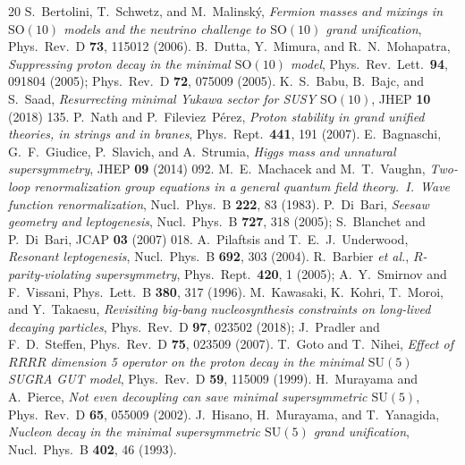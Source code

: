 \documentclass[11pt,a4paper]{article}
\begin{document}
\begin{thebibliography}{20}
 S.~Bertolini, T.~Schwetz, and M.~Malinsk\'y, \textit{Fermion masses and mixings in $\mathrm{SO}(10)$ models and the neutrino challenge to $\mathrm{SO}(10)$ grand unification}, Phys.\ Rev.\ D \textbf{73}, 115012 (2006).
 B.~Dutta, Y.~Mimura, and R.~N.~Mohapatra, \textit{Suppressing proton decay in the minimal $\mathrm{SO}(10)$ model}, Phys.\ Rev.\ Lett.\ \textbf{94}, 091804 (2005); Phys.\ Rev.\ D \textbf{72}, 075009 (2005).
 K.~S.~Babu, B.~Bajc, and S.~Saad, \textit{Resurrecting minimal Yukawa sector for SUSY $\mathrm{SO}(10)$}, JHEP \textbf{10} (2018) 135.
 P.~Nath and P.~Fileviez~P\'erez, \textit{Proton stability in grand unified theories, in strings and in branes}, Phys.\ Rept.\ \textbf{441}, 191 (2007).
 E.~Bagnaschi, G.~F.~Giudice, P.~Slavich, and A.~Strumia, \textit{Higgs mass and unnatural supersymmetry}, JHEP \textbf{09} (2014) 092.
 M.~E.~Machacek and M.~T.~Vaughn, \textit{Two-loop renormalization group equations in a general quantum field theory.\ I.\ Wave function renormalization}, Nucl.\ Phys.\ B \textbf{222}, 83 (1983).
 P.~Di~Bari, \textit{Seesaw geometry and leptogenesis}, Nucl.\ Phys.\ B \textbf{727}, 318 (2005); S.~Blanchet and P.~Di~Bari, JCAP \textbf{03} (2007) 018.
 A.~Pilaftsis and T.~E.~J.~Underwood, \textit{Resonant leptogenesis}, Nucl.\ Phys.\ B \textbf{692}, 303 (2004).
 R.~Barbier \textit{et al.}, \textit{$R$-parity-violating supersymmetry}, Phys.\ Rept.\ \textbf{420}, 1 (2005); A.~Y.~Smirnov and F.~Vissani, Phys.\ Lett.\ B \textbf{380}, 317 (1996).
 M.~Kawasaki, K.~Kohri, T.~Moroi, and Y.~Takaesu, \textit{Revisiting big-bang nucleosynthesis constraints on long-lived decaying particles}, Phys.\ Rev.\ D \textbf{97}, 023502 (2018); J.~Pradler and F.~D.~Steffen, Phys.\ Rev.\ D \textbf{75}, 023509 (2007).
 T.~Goto and T.~Nihei, \textit{Effect of $RRRR$ dimension 5 operator on the proton decay in the minimal $\mathrm{SU}(5)$ SUGRA GUT model}, Phys.\ Rev.\ D \textbf{59}, 115009 (1999).
 H.~Murayama and A.~Pierce, \textit{Not even decoupling can save minimal supersymmetric $\mathrm{SU}(5)$}, Phys.\ Rev.\ D \textbf{65}, 055009 (2002).
 J.~Hisano, H.~Murayama, and T.~Yanagida, \textit{Nucleon decay in the minimal supersymmetric $\mathrm{SU}(5)$ grand unification}, Nucl.\ Phys.\ B \textbf{402}, 46 (1993).

\end{thebibliography}
\end{document}
